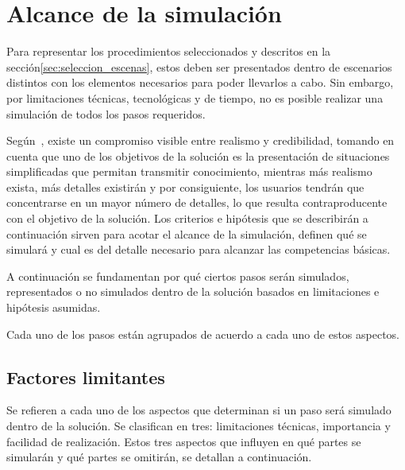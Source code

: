 \section{Alcance de la simulación}
\label{sec:hipotesis}

Para representar los procedimientos seleccionados y descritos en la
sección\ref{sec:seleccion_escenas}, estos deben ser presentados dentro de
escenarios distintos con los elementos necesarios para poder llevarlos a cabo.
Sin embargo, por limitaciones técnicas, tecnológicas y de tiempo, no es posible
realizar una simulación de todos los pasos requeridos.

Según~\cite{videojuegos:gonzaleztardon}, existe un compromiso visible entre
realismo y credibilidad, tomando en cuenta que uno de los objetivos de la
solución es la presentación de situaciones simplificadas que permitan transmitir
conocimiento, mientras más realismo exista, más detalles existirán y por
consiguiente, los usuarios tendrán que concentrarse en un mayor número de
detalles, lo que resulta contraproducente con el objetivo de la
solución\cite{videojuegos:gonzaleztardon}. Los criterios e hipótesis que se 
describirán a continuación sirven para acotar el
alcance de la simulación, definen qué se simulará y cual es del detalle
necesario para alcanzar las competencias básicas.

A continuación se fundamentan por qué ciertos pasos serán simulados, representados 
o no simulados dentro de la solución basados en limitaciones e hipótesis asumidas.

Cada uno de los pasos están agrupados de acuerdo a cada uno de estos aspectos.

\subsection{Factores limitantes}

Se refieren a cada uno de los aspectos que determinan si un paso 
será simulado dentro de la solución. Se clasifican en tres: limitaciones técnicas, 
importancia y facilidad de realización. Estos tres aspectos que influyen en qué partes 
se simularán y qué partes se omitirán, se detallan a continuación.

